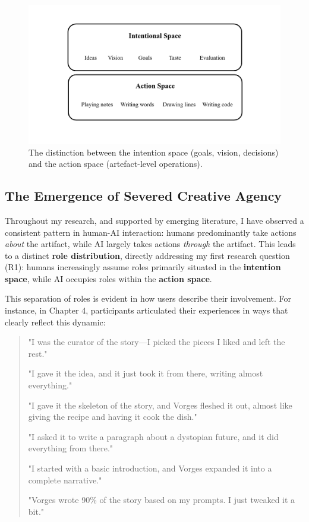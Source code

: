 \begin{figure}[H]
 \centering
\includegraphics[width=1\linewidth]{intention action spaces.png}
 \caption{The distinction between the intention space (goals, vision, decisions) and the action space (artefact-level operations).}
 \label{fig:intention-action-spaces}
\end{figure}

\subsection{The Emergence of Severed Creative Agency}

Throughout my research, and supported by emerging literature, I have observed a consistent pattern in human-AI interaction: humans predominantly take actions \textit{about} the artifact, while AI largely takes actions \textit{through} the artifact. This leads to a distinct \textbf{role distribution}, directly addressing my first research question (R1): humans increasingly assume roles primarily situated in the \textbf{intention space}, while AI occupies roles within the \textbf{action space}.

This separation of roles is evident in how users describe their involvement. For instance, in Chapter 4, participants articulated their experiences in ways that clearly reflect this dynamic:

\begin{quote}
"I was the curator of the story—I picked the pieces I liked and left the rest."

"I gave it the idea, and it just took it from there, writing almost everything."

"I gave it the skeleton of the story, and Vorges fleshed it out, almost like giving the recipe and having it cook the dish."

"I asked it to write a paragraph about a dystopian future, and it did everything from there."

"I started with a basic introduction, and Vorges expanded it into a complete narrative."

"Vorges wrote 90\% of the story based on my prompts. I just tweaked it a bit."
\end{quote}

